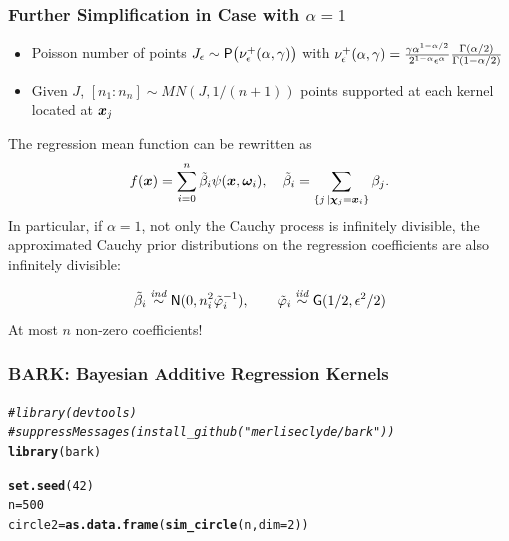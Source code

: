 \documentclass[]{beamer}\usepackage[]{graphicx}\usepackage[]{color}
\makeatletter
\newcommand{\hlnum}[1]{\textcolor[rgb]{0.686,0.059,0.569}{#1}}%
\newcommand{\hlcom}[1]{\textcolor[rgb]{0.678,0.584,0.686}{\textit{#1}}}%
\newcommand{\hlstd}[1]{\textcolor[rgb]{0.345,0.345,0.345}{#1}}%
\newcommand{\hlkwb}[1]{\textcolor[rgb]{0.69,0.353,0.396}{#1}}%
\newcommand{\hlkwc}[1]{\textcolor[rgb]{0.333,0.667,0.333}{#1}}%
\newcommand{\hlkwd}[1]{\textcolor[rgb]{0.737,0.353,0.396}{\textbf{#1}}}%
\newenvironment{kframe}{%
 \def\at@end@of@kframe{}%
 \ifinner\ifhmode%
  \def\at@end@of@kframe{\end{minipage}}%
  \begin{minipage}{\columnwidth}%
 \fi\fi%
 \def\FrameCommand##1{\hskip\@totalleftmargin \hskip-\fboxsep
 \colorbox{shadecolor}{##1}\hskip-\fboxsep
     \hskip-\linewidth \hskip-\@totalleftmargin \hskip\columnwidth}%
 \MakeFramed {\advance\hsize-\width
   \@totalleftmargin\z@ \linewidth\hsize
   \@setminipage}}%
 {\par\unskip\endMakeFramed%
 \at@end@of@kframe}
\newenvironment{knitrout}{}{} %
\newcommand{\bs}[2]{\begin{frame} \frametitle{#1}
{#2}
\end{frame} }
\makeatother
\begin{document}
\bs{Further Simplification in Case with $\alpha = 1$} {
  \begin{itemize}
  \item Poisson number of points $J_\epsilon\sim \mbox{\sf P}\big(
    \nu_\epsilon^+(\alpha, \gamma) \big)$ with $\nu_\epsilon^+(\alpha, \gamma)
  = \frac{\gamma \alpha^{1-\alpha/2}}{2^{1 - \alpha}\epsilon^\alpha}
  \frac{\Gamma(\alpha/2)}{\Gamma(1-\alpha/2)}$ \pause
  \item Given $J$, $[ n_1 : n_n] \sim  MN(J, 1/(n+1))$ points
    supported at each kernel located at $\bm x_j$  \pause
  \end{itemize}
The regression mean function can be rewritten as
\[
  f(\bm x) = \sum_{i=0}^n \tilde{\beta}_i \psi(\bm x, \bm \omega_i), \quad
  \tilde{\beta}_i = \sum_{\{j \, \mid \bm \chi_j = \bm x_i\}} \beta_j.
\]
\pause
In particular, if $\alpha = 1$, not only the Cauchy process is infinitely
divisible, the approximated Cauchy prior distributions on the regression
coefficients are also infinitely divisible:

$$
  \tilde{\beta}_i  \mathrel{\mathop{\sim}\limits^{\mathit{ind}}}
  \textsf{N}(0, n_i^2 \tilde{\varphi}_i^{-1}), \qquad
  \tilde{\varphi}_i \mathrel{\mathop{\sim}\limits^{\mathit{iid}}} \mbox{\sf G}( 1/2, \epsilon^2/2)
$$
\pause
At most $n$ non-zero coefficients!
}

\begin{frame}[fragile] \frametitle{BARK: Bayesian Additive Regression Kernels }
\begin{knitrout}
\color{fgcolor}\begin{kframe}
\begin{alltt}
\hlcom{#library(devtools)}
\hlcom{#suppressMessages(install_github("merliseclyde/bark"))}
\hlkwd{library}\hlstd{(bark)}

\hlkwd{set.seed}\hlstd{(}\hlnum{42}\hlstd{)}
\hlstd{n} \hlkwb{=} \hlnum{500}
\hlstd{circle2} \hlkwb{=} \hlkwd{as.data.frame}\hlstd{(}\hlkwd{sim_circle}\hlstd{(n,} \hlkwc{dim} \hlstd{=} \hlnum{2}\hlstd{))}
\end{alltt}
\end{kframe}
\end{knitrout}

\end{frame}
\end{document}
